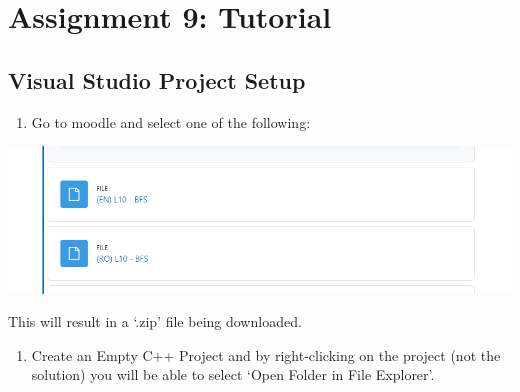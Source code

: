 \documentclass[../en-fa-lab.tex]{subfiles}
\begin{document}
\section{\texorpdfstring{\textbf{Assignment 9: Tutorial}}{Assignment 9: Tutorial}}\label{assign9}


\subsection{Visual Studio Project Setup}\label{visual-studio-project-setup}

\begin{enumerate}
\def\labelenumi{\arabic{enumi}.}
\item
  Go to moodle and select one of the following:
\end{enumerate}

\includegraphics[width=\textwidth,alt={A white rectangular object with a black border Description automatically generated with medium confidence}]{./Resources/tutorial_lab9/image1.png}

This will result in a `.zip' file being downloaded.

\begin{enumerate}
\def\labelenumi{\arabic{enumi}.}
\setcounter{enumi}{1}
\item
  Create an Empty C++ Project and by right-clicking on the project (not
  the solution) you will be able to select `Open Folder in File
  Explorer'.
\end{enumerate}
\end{document}
